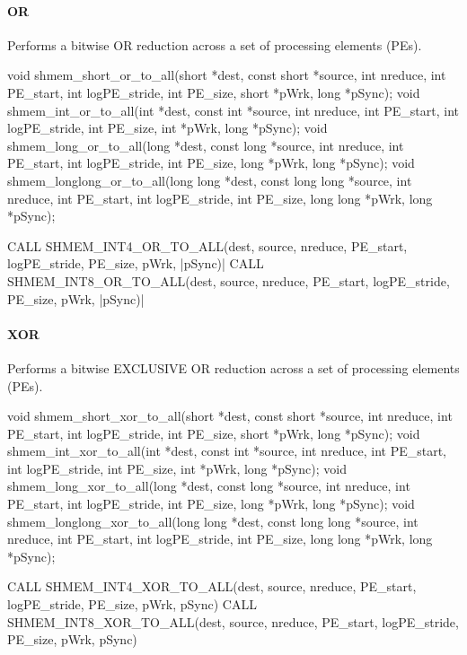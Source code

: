 \begin{apidefinition}
\paragraph{OR}
Performs a bitwise OR reduction across a set of processing elements (\acp{PE}).\newline
\begin{Csynopsis}
void shmem_short_or_to_all(short *dest, const short *source, int nreduce, int PE_start, int logPE_stride, int PE_size, short *pWrk, long *pSync);
void shmem_int_or_to_all(int *dest, const int *source, int nreduce, int PE_start, int logPE_stride, int PE_size, int *pWrk, long *pSync);
void shmem_long_or_to_all(long *dest, const long *source, int nreduce, int PE_start, int logPE_stride, int PE_size, long *pWrk, long *pSync);
void shmem_longlong_or_to_all(long long *dest, const long long *source, int nreduce, int PE_start, int logPE_stride, int PE_size, long long *pWrk, long *pSync);
\end{Csynopsis}

\begin{Fsynopsis}
CALL SHMEM_INT4_OR_TO_ALL(dest, source, nreduce, PE_start, logPE_stride, PE_size, pWrk, |\mbox{pSync)}|
CALL SHMEM_INT8_OR_TO_ALL(dest, source, nreduce, PE_start, logPE_stride, PE_size, pWrk, |\mbox{pSync)}|
\end{Fsynopsis}

\paragraph{XOR}
Performs a bitwise EXCLUSIVE OR reduction across a set of processing elements (\acp{PE}).\newline
\begin{Csynopsis}
void shmem_short_xor_to_all(short *dest, const short *source, int nreduce, int PE_start, int logPE_stride, int PE_size, short *pWrk, long *pSync);
void shmem_int_xor_to_all(int *dest, const int *source, int nreduce, int PE_start, int logPE_stride, int PE_size, int *pWrk, long *pSync);
void shmem_long_xor_to_all(long *dest, const long *source, int nreduce, int PE_start, int logPE_stride, int PE_size, long *pWrk, long *pSync);
void shmem_longlong_xor_to_all(long long *dest, const long long *source, int nreduce, int PE_start, int logPE_stride, int PE_size, long long *pWrk, long *pSync);
\end{Csynopsis}

\begin{Fsynopsis}
CALL SHMEM_INT4_XOR_TO_ALL(dest, source, nreduce, PE_start, logPE_stride, PE_size, pWrk, pSync)
CALL SHMEM_INT8_XOR_TO_ALL(dest, source, nreduce, PE_start, logPE_stride, PE_size, pWrk, pSync)
\end{Fsynopsis}


\end{apidefinition}
